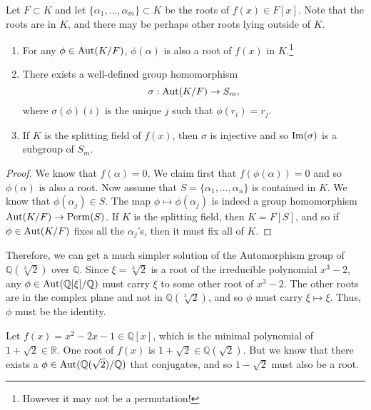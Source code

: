   \begin{lemma}
    \label{thm:f_auto_permute}
    Let $F \subset K$ and let $\{\alpha_1, \ldots, \alpha_m\} \subset K$ be the roots of $f(x) \in F[x]$. Note that the roots are in $K$, and there may be perhaps other roots lying outside of $K$. 
    \begin{enumerate}
      \item For any $\phi \in \Aut(K/F)$, $\phi(\alpha)$ is also a root of $f(x)$ in $K$.\footnote{However it may not be a permutation!}

      \item There exists a well-defined group homomorphism 
      \begin{equation}
        \sigma: \Aut(K/F) \to S_m, 
      \end{equation}
      where $\sigma(\phi)(i)$ is the unique $j$ such that $\phi(r_i) = r_j$. 

      \item If $K$ is the splitting field of $f(x)$, then $\sigma$ is injective and so $\im(\sigma)$ is a subgroup of $S_m$. 
    \end{enumerate}
  \end{lemma}
  \begin{proof}
    We know that $f(\alpha) = 0$. We claim first that $f(\phi(\alpha)) = 0$ and so $\phi(\alpha)$ is also a root. Now assume that $S = \{\alpha_1, \ldots, \alpha_n\}$ is contained in $K$. We know that $\phi(\alpha_j) \in S$. The map $\phi \mapsto \phi(\alpha_j)$ is indeed a group homomorphism $\Aut(K/F) \to \mathrm{Perm}(S)$. If $K$ is the splitting field, then $K = F[S]$, and so if $\phi \in \Aut(K/F)$ fixes all the $\alpha_j$'s, then it must fix all of $K$. 
  \end{proof} 

  \begin{example}
    Therefore, we can get a much simpler solution of the Automorphism group of $\mathbb{Q}(\sqrt[3]{2})$ over $\mathbb{Q}$. Since $\xi = \sqrt[3]{2}$ is a root of the irreducible polynomial $x^3 - 2$, any $\phi \in \Aut(\mathbb{Q}[\xi]/\mathbb{Q})$ must carry $\xi$ to some other root of $x^3 - 2$. The other roots are in the complex plane and not in $\mathbb{Q}(\sqrt[3]{2})$, and so $\phi$ must carry $\xi \mapsto \xi$. Thus, $\phi$ must be the identity. 
  \end{example}

  \begin{example}
    Let $f(x) = x^2 - 2x - 1 \in \mathbb{Q}[x]$, which is the minimal polynomial of $1 + \sqrt{2} \in \mathbb{R}$. One root of $f(x)$ is $1 + \sqrt{2} \in \mathbb{Q}(\sqrt{2})$. But we know that there exists a $\phi \in \Aut(\mathbb{Q}(\sqrt{2})/\mathbb{Q})$ that conjugates, and so $1 - \sqrt{2}$ must also be a root. 
  \end{example} 

